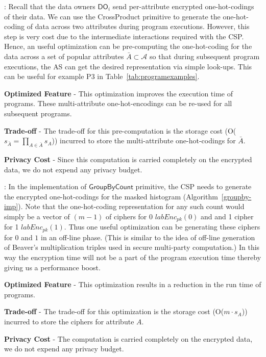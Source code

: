 :  
Recall that the data owners $\textsf{DO}_i$ send per-attribute encrypted one-hot-codings of their data. We can use the \textsf{CrossProduct} primitive to generate the one-hot-coding of data across two attributes during program executions. However, this step is very cost due to the intermediate interactions required with the \textsf{CSP}. Hence, an  useful optimization can be  pre-computing the one-hot-coding for the data across a set of popular attributes $\bar{A} \subset \mathcal{A}$ so that during subsequent program executions, the \textsf{AS} can get the desired representation via simple look-ups.  This can be useful for example P3 in Table~\ref{tab:programexamples}.
\squishlist
\item \textbf{Optimized Feature} - This optimization improves the execution time of \system programs. These multi-attribute one-hot-encodings can be re-used for all subsequent programs.
\item  \textbf{Trade-off} - The trade-off for this pre-computation is the storage cost (O($s_{\bar{A}}=\prod_{A \in \bar{A}}s_A$)) incurred to store the multi-attribute one-hot-codings for $\bar{A}$.
\item \textbf{Privacy Cost} - Since this computation is carried completely on the encrypted data, we do not expend any privacy budget.
\squishend

:
In the implementation of $\textsf{GroupByCount}$ primitive, the \textsf{CSP} needs to generate the encrypted one-hot-codings for the masked histogram (Algorithm~\ref{groupby-imp}). Note that the one-hot-coding representation for any such count would simply be a vector of $(m-1)$ of ciphers for 0 $labEnc_{pk}(0)$ and and 1 cipher for 1 $labEnc_{pk}(1)$. Thus one useful optimization can be generating these ciphers for $0$ and $1$ in an off-line phase. (This is similar to the idea of off-line generation of Beaver's multiplication triples \cite{Beaver} used in secure multi-party computation.) In this way the encryption time will not be a part of the program execution time thereby giving us a performance boost.
\squishlist
\item \textbf{Optimized Feature} - This optimization results in a reduction in the run time of \system programs. 
\item \textbf{Trade-off} - The trade-off for this optimization is the storage cost (O($m\cdot s_A$)) incurred to store the ciphers for attribute $A$.
\item \textbf{Privacy Cost} - The computation is carried completely on the encrypted data, we do not expend any privacy budget.
\squishend

